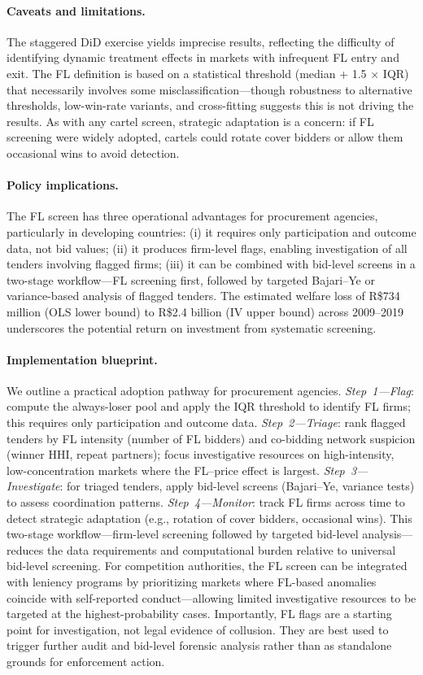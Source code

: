\paragraph{Caveats and limitations.}
The staggered DiD exercise yields imprecise results, reflecting the
difficulty of identifying dynamic treatment effects in markets with
infrequent FL entry and exit. The FL definition is based on a
statistical threshold (median + 1.5 $\times$ IQR) that necessarily
involves some misclassification---though robustness to alternative
thresholds, low-win-rate variants, and cross-fitting suggests this is
not driving the results. As with any cartel screen, strategic adaptation
is a concern: if FL screening were widely adopted, cartels could rotate
cover bidders or allow them occasional wins to avoid detection.

\paragraph{Policy implications.}
The FL screen has three operational advantages for procurement agencies,
particularly in developing countries: (i) it requires only participation
and outcome data, not bid values; (ii) it produces firm-level flags,
enabling investigation of all tenders involving flagged firms; (iii) it
can be combined with bid-level screens in a two-stage workflow---FL
screening first, followed by targeted Bajari--Ye or variance-based
analysis of flagged tenders. The estimated welfare loss of R\$734 million (OLS lower bound) to
R\$2.4 billion (IV upper bound) across 2009--2019 underscores the
potential return on investment from systematic screening.

\paragraph{Implementation blueprint.}
We outline a practical adoption pathway for procurement agencies.
\emph{Step~1---Flag}: compute the always-loser pool and apply the IQR
threshold to identify FL firms; this requires only participation and
outcome data. \emph{Step~2---Triage}: rank flagged tenders by FL
intensity (number of FL bidders) and co-bidding network suspicion
(winner HHI, repeat partners); focus investigative resources on
high-intensity, low-concentration markets where the FL--price effect is
largest. \emph{Step~3---Investigate}: for triaged tenders, apply
bid-level screens (Bajari--Ye, variance tests) to assess coordination
patterns. \emph{Step~4---Monitor}: track FL firms across time to detect
strategic adaptation (e.g., rotation of cover bidders, occasional
wins). This two-stage workflow---firm-level screening followed by
targeted bid-level analysis---reduces the data requirements and
computational burden relative to universal bid-level screening.
For competition authorities, the FL screen can be integrated with
leniency programs by prioritizing markets where FL-based anomalies
coincide with self-reported conduct---allowing limited investigative
resources to be targeted at the highest-probability cases. Importantly,
FL flags are a starting point for investigation, not legal evidence of
collusion. They are best used to trigger further audit and bid-level
forensic analysis rather than as standalone grounds for enforcement
action.

